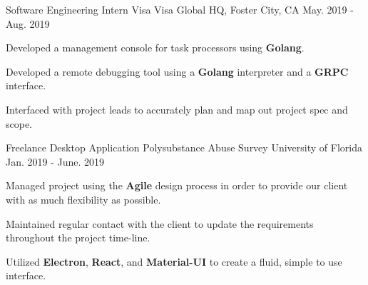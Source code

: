 \begin{cventries}
	
	\cventry
	{Software Engineering Intern} %
	{Visa} %
	{Visa Global HQ, Foster City, CA} %
	{May. 2019 - Aug. 2019} %
	{ %
		\begin{cvitems}
			\setlength{\itemindent}{.125in}
			\item {Developed a management console for task processors using \textbf{Golang}.}
			\item {Developed a remote debugging tool using a \textbf{Golang} interpreter and a \textbf{GRPC} interface.}
			\item {Interfaced with project leads to accurately plan and map out project spec and scope.}
		\end{cvitems}
	}
	
	
	\cventry
	{Freelance Desktop Application} %
	{Polysubstance Abuse Survey} %
	{University of Florida} %
	{Jan. 2019 - June. 2019} %
	{ %
		\begin{cvitems}
			\setlength{\itemindent}{.125in}
			\item {Managed project using the \textbf{Agile} design process in order to provide our client with as much flexibility as possible.}
			\item {Maintained regular contact with the client to update the requirements throughout the project time-line.}
			\item {Utilized \textbf{Electron}, \textbf{React}, and \textbf{Material-UI} to create a fluid, simple to use interface. }
		\end{cvitems}
	}


	
\end{cventries}

